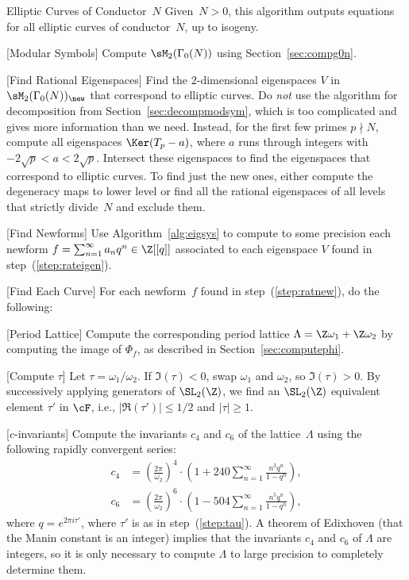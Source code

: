 \begin{algorithm}{Elliptic Curves of Conductor~$N$}
Given~$N> 0$, this
algorithm outputs equations for all
elliptic curves of conductor~$N$, up to isogeny.
\begin{steps}
\item{}[Modular Symbols] 
  Compute $\sM_2(\Gamma_0(N))$ using Section~\ref{sec:compg0n}.

\item{}[Find Rational Eigenspaces] \label{step:rateigen}
Find the $2$-dimensional eigenspaces $V$ in 
$\sM_2(\Gamma_0(N))_{\new}$ that correspond to elliptic curves.
Do {\em not} use the algorithm for decomposition from 
Section~\ref{sec:decompmodsym}, which is too complicated
and gives more information than we need.  Instead, for the first
few primes $p\nmid N$, compute all eigenspaces $\Ker(T_p - a)$, where
$a$ runs through integers with $-2\sqrt{p} < a  <  2\sqrt{p}$.
Intersect these eigenspaces to find the eigenspaces that 
correspond to elliptic curves.  To find just the new ones,
either compute the degeneracy maps to lower level or find
all the rational eigenspaces of all levels that strictly
divide~$N$ and exclude them.

\item{}[Find Newforms]\label{step:ratnew}
Use Algorithm~\ref{alg:eigsys}
to compute to some precision each newform $f=\sum_{n=1}^{\infty} a_n q^n \in \Z[[q]]$ associated
to each eigenspace $V$ found in step~(\ref{step:rateigen}).

\item{}[Find Each Curve] 
For each newform~$f$ 
found in step~(\ref{step:ratnew}), do the following:

\begin{steps}
\item{}[Period Lattice] Compute the corresponding
period lattice $\Lambda=\Z\omega_1 + \Z\omega_2$ 
by computing the image of $\Phi_f$, 
as described in Section~\ref{sec:computephi}.

\item{}[Compute $\tau$]\label{step:tau}
Let $\tau=\omega_1/\omega_2$.  If $\Im(\tau)<0$, swap
$\omega_1$ and $\omega_2$, so $\Im(\tau)>0$.  
By successively applying generators of $\SL_2(\Z)$,
we find an $\SL_2(\Z)$ equivalent element $\tau'$
in $\cF$, i.e.,
$|\Re(\tau')|\leq 1/2$ and $|\tau|\geq 1$.

\item{}[$c$-invariants] Compute the invariants $c_4$
and $c_6$ of the lattice~$\Lambda$ using the following 
rapidly convergent series:
\begin{align*}
c_4 &= \left(\frac{2\pi}{\omega_2}\right)^4 \cdot
      \left(1+240\sum_{n=1}^{\infty}\frac{n^3q^n}{1-q^n}\right),\\
c_6 &= \left(\frac{2\pi}{\omega_2}\right)^6 \cdot
      \left(1-504\sum_{n=1}^{\infty}\frac{n^5q^n}{1-q^n}\right),
    \end{align*}
where $q=e^{2\pi i \tau'}$, where $\tau'$ is as in step~(\ref{step:tau}).
A theorem of Edixhoven
(that the Manin constant is an integer) implies that
the invariants $c_4$ and $c_6$ of $\Lambda$ are integers,
so it is only necessary to compute $\Lambda$ to large
precision to completely determine them.


\end{steps}
\end{steps}
\end{algorithm}
